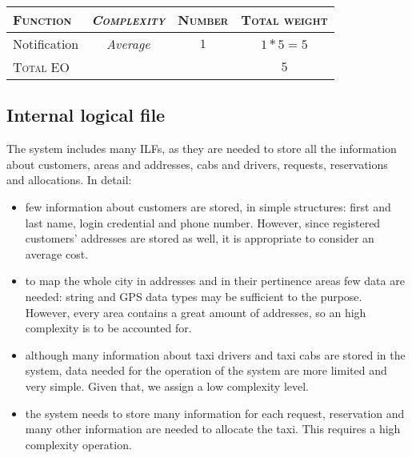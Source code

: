 \begin{table*}\begin{tabularx}{\textwidth}{ X >{\itshape}C{\myWFP} C{\myWFP} C{\myWFP} }

\toprule
	
	\normalfont\textsc{Function} &
	\normalfont\textsc{Complexity}	& 
	\normalfont\textsc{Number} &
	\normalfont\textsc{Total weight} \\

\toprule

	Notification	& Average		& $ 1 $		& $ 1*5 = 5 $ \\

\bottomrule

\normalfont\textsc{Total} EO && & $ 5 $ \\
\bottomrule


\end{tabularx}\end{table*}



\subsection*{Internal logical file}



The system includes many ILFs, as they are needed to store all the information about customers, areas and addresses, cabs and drivers, requests, reservations and allocations. In detail:

\begin{itemize}
	\item few information about customers are stored, in simple structures: first and last name, login credential and phone number. However, since registered customers' addresses are stored as well, it is appropriate to consider an average cost.
	\item to map the whole city in addresses and in their pertinence areas few data are needed: string and GPS data types may be sufficient to the purpose. However, every area contains a great amount of addresses, so an high complexity is to be accounted for.
	\item although many information about taxi drivers and taxi cabs are stored in the system, data needed for the operation of the system are more limited and very simple. Given that, we assign a low complexity level.
	\item the system needs to store many information for each request, reservation and many other information are needed to allocate the taxi. This requires a high complexity operation.
\end{itemize}






